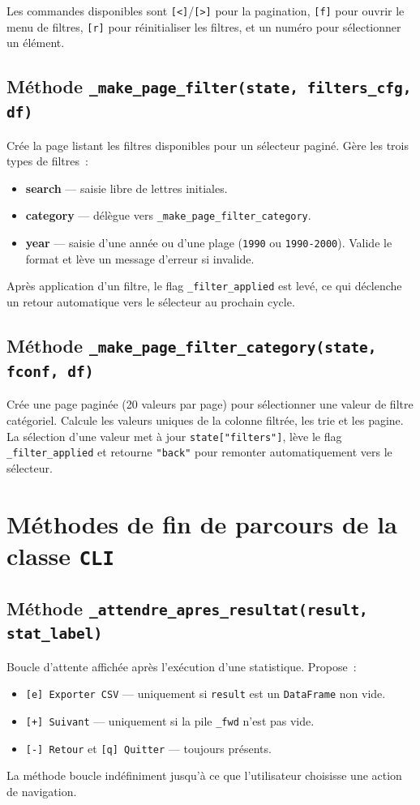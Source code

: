 \documentclass[12pt,a4paper]{article}
\begin{document}
Les commandes disponibles sont \texttt{[<]}/\texttt{[>]} pour la
pagination, \texttt{[f]} pour ouvrir le menu de filtres, \texttt{[r]}
pour réinitialiser les filtres, et un numéro pour sélectionner un
élément.

\subsection{Méthode \texttt{\_make\_page\_filter(state, filters\_cfg, df)}}
Crée la page listant les filtres disponibles pour un sélecteur paginé.
Gère les trois types de filtres~:
\begin{itemize}
    \item \textbf{search} — saisie libre de lettres initiales.
    \item \textbf{category} — délègue vers
    \texttt{\_make\_page\_filter\_category}.
    \item \textbf{year} — saisie d'une année ou d'une plage
    (\texttt{1990} ou \texttt{1990-2000}). Valide le format et lève
    un message d'erreur si invalide.
\end{itemize}
Après application d'un filtre, le flag \texttt{\_filter\_applied} est
levé, ce qui déclenche un retour automatique vers le sélecteur au
prochain cycle.

\subsection{Méthode \texttt{\_make\_page\_filter\_category(state, fconf, df)}}
Crée une page paginée (20 valeurs par page) pour sélectionner une
valeur de filtre catégoriel. Calcule les valeurs uniques de la colonne
filtrée, les trie et les pagine. La sélection d'une valeur met à jour
\texttt{state["filters"]}, lève le flag \texttt{\_filter\_applied}
et retourne \texttt{"back"} pour remonter automatiquement vers le
sélecteur.

\section{Méthodes de fin de parcours de la classe \texttt{CLI}}

\subsection{Méthode \texttt{\_attendre\_apres\_resultat(result, stat\_label)}}
Boucle d'attente affichée après l'exécution d'une statistique.
Propose~:
\begin{itemize}
    \item \texttt{[e] Exporter CSV} — uniquement si \texttt{result}
    est un \texttt{DataFrame} non vide.
    \item \texttt{[+] Suivant} — uniquement si la pile \texttt{\_fwd}
    n'est pas vide.
    \item \texttt{[-] Retour} et \texttt{[q] Quitter} — toujours
    présents.
\end{itemize}
La méthode boucle indéfiniment jusqu'à ce que l'utilisateur choisisse
une action de navigation.
\end{document}
